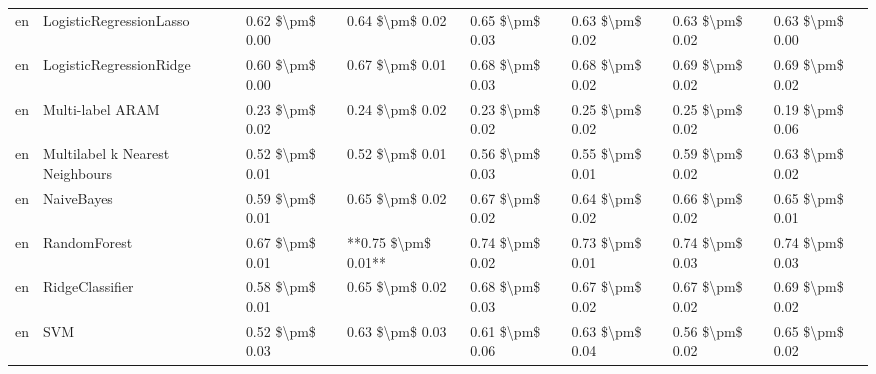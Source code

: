 \begin{tabular}{llllllll}
      en &         LogisticRegressionLasso & 0.62 \$\textbackslash pm\$ 0.00 &           0.64 \$\textbackslash pm\$ 0.02 &       0.65 \$\textbackslash pm\$ 0.03 &        0.63 \$\textbackslash pm\$ 0.02 &                         0.63 \$\textbackslash pm\$ 0.02 &     0.63 \$\textbackslash pm\$ 0.00 \\
      en &         LogisticRegressionRidge & 0.60 \$\textbackslash pm\$ 0.00 &           0.67 \$\textbackslash pm\$ 0.01 &       0.68 \$\textbackslash pm\$ 0.03 &        0.68 \$\textbackslash pm\$ 0.02 &                         0.69 \$\textbackslash pm\$ 0.02 &     0.69 \$\textbackslash pm\$ 0.02 \\
      en &                Multi-label ARAM & 0.23 \$\textbackslash pm\$ 0.02 &           0.24 \$\textbackslash pm\$ 0.02 &       0.23 \$\textbackslash pm\$ 0.02 &        0.25 \$\textbackslash pm\$ 0.02 &                         0.25 \$\textbackslash pm\$ 0.02 &     0.19 \$\textbackslash pm\$ 0.06 \\
      en & Multilabel k Nearest Neighbours & 0.52 \$\textbackslash pm\$ 0.01 &           0.52 \$\textbackslash pm\$ 0.01 &       0.56 \$\textbackslash pm\$ 0.03 &        0.55 \$\textbackslash pm\$ 0.01 &                         0.59 \$\textbackslash pm\$ 0.02 &     0.63 \$\textbackslash pm\$ 0.02 \\
      en &                      NaiveBayes & 0.59 \$\textbackslash pm\$ 0.01 &           0.65 \$\textbackslash pm\$ 0.02 &       0.67 \$\textbackslash pm\$ 0.02 &        0.64 \$\textbackslash pm\$ 0.02 &                         0.66 \$\textbackslash pm\$ 0.02 &     0.65 \$\textbackslash pm\$ 0.01 \\
      en &                    RandomForest & 0.67 \$\textbackslash pm\$ 0.01 &       **0.75 \$\textbackslash pm\$ 0.01** &       0.74 \$\textbackslash pm\$ 0.02 &        0.73 \$\textbackslash pm\$ 0.01 &                         0.74 \$\textbackslash pm\$ 0.03 &     0.74 \$\textbackslash pm\$ 0.03 \\
      en &                 RidgeClassifier & 0.58 \$\textbackslash pm\$ 0.01 &           0.65 \$\textbackslash pm\$ 0.02 &       0.68 \$\textbackslash pm\$ 0.03 &        0.67 \$\textbackslash pm\$ 0.02 &                         0.67 \$\textbackslash pm\$ 0.02 &     0.69 \$\textbackslash pm\$ 0.02 \\
      en &                             SVM & 0.52 \$\textbackslash pm\$ 0.03 &           0.63 \$\textbackslash pm\$ 0.03 &       0.61 \$\textbackslash pm\$ 0.06 &        0.63 \$\textbackslash pm\$ 0.04 &                         0.56 \$\textbackslash pm\$ 0.02 &     0.65 \$\textbackslash pm\$ 0.02 \\

\end{tabular}
